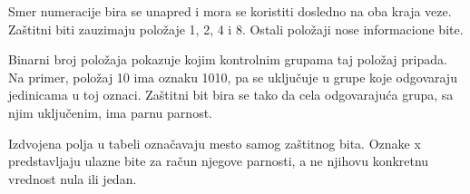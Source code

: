 Smer numeracije bira se unapred i mora se koristiti dosledno na oba kraja veze. Zaštitni biti zauzimaju položaje 1, 2, 4 i 8. Ostali položaji nose informacione bite.

Binarni broj položaja pokazuje kojim kontrolnim grupama taj položaj pripada. Na primer, položaj 10 ima oznaku 1010, pa se uključuje u grupe koje odgovaraju jedinicama u toj oznaci. Zaštitni bit bira se tako da cela odgovarajuća grupa, sa njim uključenim, ima parnu parnost.

Izdvojena polja u tabeli označavaju mesto samog zaštitnog bita. Oznake x predstavljaju ulazne bite za račun njegove parnosti, a ne njihovu konkretnu vrednost nula ili jedan.
